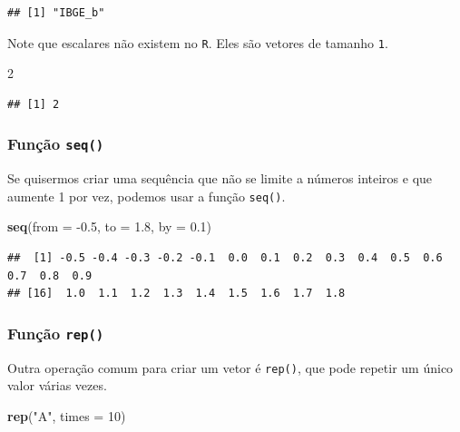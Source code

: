 \documentclass[
]{book}
\newenvironment{Shaded}{\begin{snugshade}}{\end{snugshade}}
\newcommand{\DataTypeTok}[1]{\textcolor[rgb]{0.13,0.29,0.53}{#1}}
\newcommand{\DecValTok}[1]{\textcolor[rgb]{0.00,0.00,0.81}{#1}}
\newcommand{\FloatTok}[1]{\textcolor[rgb]{0.00,0.00,0.81}{#1}}
\newcommand{\KeywordTok}[1]{\textcolor[rgb]{0.13,0.29,0.53}{\textbf{#1}}}
\newcommand{\NormalTok}[1]{#1}
\newcommand{\StringTok}[1]{\textcolor[rgb]{0.31,0.60,0.02}{#1}}
\theoremstyle{definition}
\theoremstyle{definition}
\theoremstyle{definition}
\theoremstyle{remark}
\begin{document}
\begin{verbatim}
## [1] "IBGE_b"
\end{verbatim}

Note que escalares não existem no \texttt{R}. Eles são vetores de tamanho \texttt{1}.

\begin{Shaded}
\begin{Highlighting}[]
\DecValTok{2}
\end{Highlighting}
\end{Shaded}

\begin{verbatim}
## [1] 2
\end{verbatim}

\hypertarget{funuxe7uxe3o-seq}{%
\subsubsection{\texorpdfstring{Função \texttt{seq()}}{Função seq()}}\label{funuxe7uxe3o-seq}}

Se quisermos criar uma sequência que não se limite a números inteiros e que aumente 1 por vez, podemos usar a função \texttt{seq()}.

\begin{Shaded}
\begin{Highlighting}[]
\KeywordTok{seq}\NormalTok{(}\DataTypeTok{from =} \FloatTok{-0.5}\NormalTok{, }\DataTypeTok{to =} \FloatTok{1.8}\NormalTok{, }\DataTypeTok{by =} \FloatTok{0.1}\NormalTok{)}
\end{Highlighting}
\end{Shaded}

\begin{verbatim}
##  [1] -0.5 -0.4 -0.3 -0.2 -0.1  0.0  0.1  0.2  0.3  0.4  0.5  0.6  0.7  0.8  0.9
## [16]  1.0  1.1  1.2  1.3  1.4  1.5  1.6  1.7  1.8
\end{verbatim}

\hypertarget{funuxe7uxe3o-rep}{%
\subsubsection{\texorpdfstring{Função \texttt{rep()}}{Função rep()}}\label{funuxe7uxe3o-rep}}

Outra operação comum para criar um vetor é \texttt{rep()}, que pode repetir um único valor várias vezes.

\begin{Shaded}
\begin{Highlighting}[]
\KeywordTok{rep}\NormalTok{(}\StringTok{"A"}\NormalTok{, }\DataTypeTok{times =} \DecValTok{10}\NormalTok{)}
\end{Highlighting}
\end{Shaded}
\end{document}
